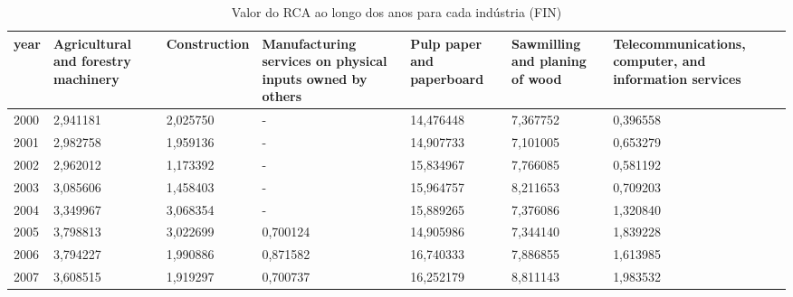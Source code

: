 \begin{table}
\centering
\caption{Valor do RCA ao longo dos anos para cada indústria (FIN)}
\begin{tabular}{p{1cm}p{2cm}p{2cm}p{2cm}p{2cm}p{2cm}p{2cm}}
\toprule
 year &  Agricultural and forestry machinery &  Construction &  Manufacturing services on physical inputs owned by others &  Pulp paper and paperboard &  Sawmilling and planing of wood &  Telecommunications, computer, and information services \\
\midrule
 2000 &                             2,941181 &      2,025750 &                                                  - &                  14,476448 &                        7,367752 &                                           0,396558 \\
 2001 &                             2,982758 &      1,959136 &                                                  - &                  14,907733 &                        7,101005 &                                           0,653279 \\
 2002 &                             2,962012 &      1,173392 &                                                  - &                  15,834967 &                        7,766085 &                                           0,581192 \\
 2003 &                             3,085606 &      1,458403 &                                                  - &                  15,964757 &                        8,211653 &                                           0,709203 \\
 2004 &                             3,349967 &      3,068354 &                                                  - &                  15,889265 &                        7,376086 &                                           1,320840 \\
 2005 &                             3,798813 &      3,022699 &                                           0,700124 &                  14,905986 &                        7,344140 &                                           1,839228 \\
 2006 &                             3,794227 &      1,990886 &                                           0,871582 &                  16,740333 &                        7,886855 &                                           1,613985 \\
 2007 &                             3,608515 &      1,919297 &                                           0,700737 &                  16,252179 &                        8,811143 &                                           1,983532 \\

\end{tabular}
\end{table}
